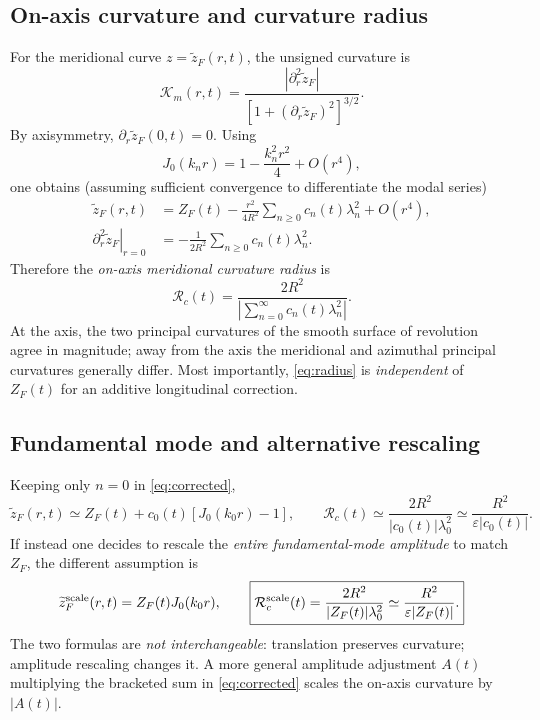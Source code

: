 \documentclass[11pt]{article}
\numberwithin{equation}{section}
\begin{document}
\subsection{On-axis curvature and curvature radius}
For the meridional curve $z=\widetilde z_F(r,t)$, the unsigned curvature is
\begin{equation}\mathcal K_m(r,t)=\frac{|\partial_r^2\widetilde z_F|}{\left[1+(\partial_r\widetilde z_F)^2\right]^{3/2}}.\end{equation}
By axisymmetry, $\partial_r\widetilde z_F(0,t)=0$. Using
\begin{equation}J_0(k_nr)=1-\frac{k_n^2r^2}{4}+O(r^4),\end{equation}
one obtains (assuming sufficient convergence to differentiate the modal series)
\begin{align}\widetilde z_F(r,t)&=Z_F(t)-\frac{r^2}{4R^2}\sum_{n\ge0}c_n(t)\lambda_n^2+O(r^4),\\
\left.\partial_r^2\widetilde z_F\right|_{r=0}&=-\frac1{2R^2}\sum_{n\ge0}c_n(t)\lambda_n^2.
\end{align}
Therefore the \emph{on-axis meridional curvature radius} is
\begin{equation}\boxed{\mathcal R_c(t)=\frac{2R^2}{\left|\sum_{n=0}^\infty c_n(t)\lambda_n^2\right|}.}\label{eq:radius}\end{equation}
At the axis, the two principal curvatures of the smooth surface of revolution agree in magnitude; away from the axis the meridional and azimuthal principal curvatures generally differ. Most importantly, \eqref{eq:radius} is \emph{independent} of $Z_F(t)$ for an additive longitudinal correction.

\subsection{Fundamental mode and alternative rescaling}
Keeping only $n=0$ in \eqref{eq:corrected},
\begin{equation}\widetilde z_F(r,t)\simeq Z_F(t)+c_0(t)[J_0(k_0r)-1],\qquad
\boxed{\mathcal R_c(t)\simeq\frac{2R^2}{|c_0(t)|\lambda_0^2}\simeq\frac{R^2}{\varepsilon|c_0(t)|}.}\label{eq:radius0}\end{equation}
If instead one decides to rescale the \emph{entire fundamental-mode amplitude} to match $Z_F$, the different assumption is
\begin{equation}\widetilde z_F^{\rm scale}(r,t)=Z_F(t)J_0(k_0r),\qquad
\boxed{\mathcal R_c^{\rm scale}(t)=\frac{2R^2}{|Z_F(t)|\lambda_0^2}\simeq\frac{R^2}{\varepsilon|Z_F(t)|}.}\end{equation}
The two formulas are \emph{not interchangeable}: translation preserves curvature; amplitude rescaling changes it. A more general amplitude adjustment $A(t)$ multiplying the bracketed sum in \eqref{eq:corrected} scales the on-axis curvature by $|A(t)|$.
\end{document}
